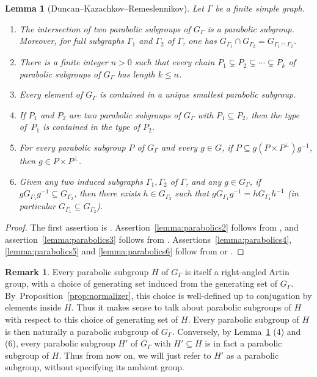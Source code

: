 \documentclass[11pt]{article}
\numberwithin{equation}{section}
\theoremstyle{plain}
\newtheorem{lemma}[theo]{Lemma}
\theoremstyle{definition}
\newtheorem{rk}[theo]{Remark}
\begin{document}
\begin{lemma}[Duncan--Kazachkov--Remeslennikov]\label{lemma:parabolics}
Let $\Gamma$ be a finite simple graph.
\begin{enumerate}
\item\label{lemma:parabolics1} The intersection of two parabolic subgroups of $G_\Gamma$ is a parabolic subgroup. Moreover, for full subgraphs $\Gamma_1$ and $\Gamma_2$ of $\Gamma$, one has $G_{\Gamma_1}\cap G_{\Gamma_2}=G_{\Gamma_1\cap\Gamma_2}$.
\item\label{lemma:parabolics2} There is a finite integer $n>0$ such that every chain $P_1\subsetneq P_2\subsetneq\cdots\subsetneq P_k$ of parabolic subgroups of $G_\Gamma$ has length $k\le n$.
\item\label{lemma:parabolics3} Every element of $G_\Gamma$ is contained in a unique smallest parabolic subgroup.
\item\label{lemma:parabolics4} If $P_1$ and $P_2$ are two parabolic subgroups of $G_\Gamma$ with $P_1\subseteq P_2$, then the type of~$P_1$ is contained in the type of $P_2$.
\item\label{lemma:parabolics5} For every parabolic subgroup $P$ of $G_\Gamma$ and every $g\in G$, if $P\subseteq g(P\times P^\perp)g^{-1}$, then $g\in P\times P^\perp$.
\item\label{lemma:parabolics6} Given any two induced subgraphs $\Gamma_1,\Gamma_2$ of $\Gamma$, and any $g\in G_\Gamma$, if \hbox{$g G_{\Gamma_1}g^{-1}\!\!\subseteq\! G_{\Gamma_2}$}, then there exists $h\in G_{\Gamma_2}$ such that $g G_{\Gamma_1}g^{-1}=h G_{\Gamma_1}h^{-1}$ (in particular $G_{\Gamma_1}\subseteq G_{\Gamma_2}$).
\end{enumerate}
\end{lemma}

\begin{proof}
The first assertion is \cite[Prop.\,2.6 \& Lem.\,2.7]{duncan2007parabolic}. Assertion~\eqref{lemma:parabolics2} follows from \cite[Prop.\,2.6]{duncan2007parabolic}, and assertion~\eqref{lemma:parabolics3} follows from \cite[Prop.\,2.8]{duncan2007parabolic}. Assertions~\eqref{lemma:parabolics4}, \eqref{lemma:parabolics5} and \eqref{lemma:parabolics6} follow from \cite[Cor.\,2.5]{duncan2007parabolic} or \cite[Prop.\,2.2]{charney2007automorphisms}.
\end{proof}

\begin{rk}
\label{remark:parabolic in parabolic}
Every parabolic subgroup $H$ of $G_\Gamma$ is itself a right-angled Artin group, with a choice of generating set induced from the generating set of $G_\Gamma$. By~Proposition~\ref{prop:normalizer}, this choice is well-defined up to conjugation by elements inside $H$. Thus it makes sense to talk about parabolic subgroups of $H$ with respect to this choice of generating set of $H$. Every parabolic subgroup of $H$ is then naturally a parabolic subgroup of $G_\Gamma$. Conversely, by Lemma~\ref{lemma:parabolics} (4) and (6), every parabolic subgroup $H'$ of $G_\Gamma$ with $H'\subseteq H$ is in fact a parabolic subgroup of $H$. Thus from now on, we will just refer to $H'$ as a parabolic subgroup, without specifying its ambient group.
\end{rk}
\end{document}

